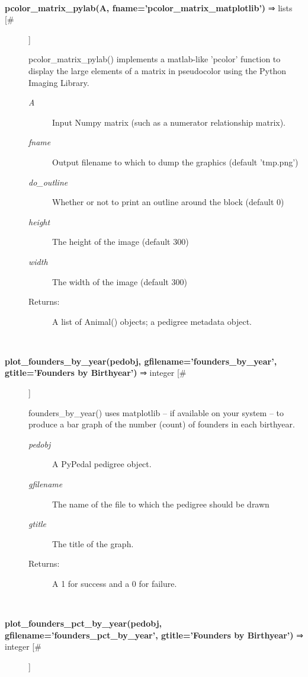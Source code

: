 \documentclass[10pt]{article}
\begin{document}
\begin{description}
\begin{description}
\end{description}
\\ 

\item[\textbf{pcolor\_matrix\_pylab(A, fname='pcolor\_matrix\_matplotlib')}
 ⇒ lists [\#]]

 pcolor\_matrix\_pylab() implements a matlab-like 'pcolor' function to display the large elements of a matrix in pseudocolor using the Python Imaging Library.
\begin{description}
\item[\emph{A}
] Input Numpy matrix (such as a numerator relationship matrix).
\item[\emph{fname}
] Output filename to which to dump the graphics (default 'tmp.png')
\item[\emph{do\_outline}
] Whether or not to print an outline around the block (default 0)
\item[\emph{height}
] The height of the image (default 300)
\item[\emph{width}
] The width of the image (default 300)
\item[Returns:] A list of Animal() objects; a pedigree metadata object.

\end{description}
\\ 

\item[\textbf{plot\_founders\_by\_year(pedobj, gfilename='founders\_by\_year', gtitle='Founders by Birthyear')}
 ⇒ integer [\#]]

 founders\_by\_year() uses matplotlib -- if available on your system -- to produce a bar graph of the number (count) of founders in each birthyear.
\begin{description}
\item[\emph{pedobj}
] A PyPedal pedigree object.
\item[\emph{gfilename}
] The name of the file to which the pedigree should be drawn
\item[\emph{gtitle}
] The title of the graph.
\item[Returns:] A 1 for success and a 0 for failure.

\end{description}
\\ 

\item[\textbf{plot\_founders\_pct\_by\_year(pedobj, gfilename='founders\_pct\_by\_year', gtitle='Founders by Birthyear')}
 ⇒ integer [\#]]


\end{description}
\end{document}
